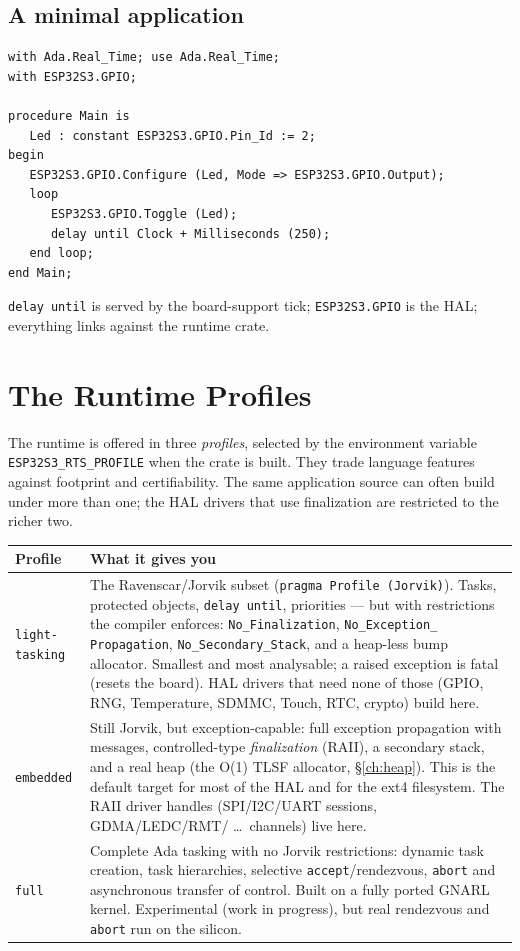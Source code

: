 \section{A minimal application}

\begin{lstlisting}
with Ada.Real_Time; use Ada.Real_Time;
with ESP32S3.GPIO;

procedure Main is
   Led : constant ESP32S3.GPIO.Pin_Id := 2;
begin
   ESP32S3.GPIO.Configure (Led, Mode => ESP32S3.GPIO.Output);
   loop
      ESP32S3.GPIO.Toggle (Led);
      delay until Clock + Milliseconds (250);
   end loop;
end Main;
\end{lstlisting}

\texttt{delay until} is served by the board-support tick; \texttt{ESP32S3.GPIO} is
the HAL; everything links against the runtime crate.

\chapter{The Runtime Profiles}
\label{ch:profiles}

The runtime is offered in three \emph{profiles}, selected by the environment
variable \texttt{ESP32S3\_RTS\_PROFILE} when the crate is built. They trade
language features against footprint and certifiability. The same application
source can often build under more than one; the HAL drivers that use finalization
are restricted to the richer two.

\begin{longtable}{p{2.6cm} p{11.3cm}}
\toprule
\textbf{Profile} & \textbf{What it gives you} \\ \midrule
\endhead
\texttt{light-tasking} &
  The Ravenscar/Jorvik subset (\texttt{pragma Profile (Jorvik)}). Tasks,
  protected objects, \texttt{delay until}, priorities --- but with restrictions
  the compiler enforces: \texttt{No\_Finalization}, \texttt{No\_Exception\_%
  Propagation}, \texttt{No\_Secondary\_Stack}, and a heap-less bump allocator.
  Smallest and most analysable; a raised exception is fatal (resets the board).
  HAL drivers that need none of those (GPIO, RNG, Temperature, SDMMC, Touch,
  RTC, crypto) build here. \\
\texttt{embedded} &
  Still Jorvik, but exception-capable: full exception propagation with messages,
  controlled-type \emph{finalization} (RAII), a secondary stack, and a real
  heap (the O(1) TLSF allocator, \S\ref{ch:heap}). This is the default target for most of the HAL and for the
  ext4 filesystem. The RAII driver handles (SPI/I2C/UART sessions, GDMA/LEDC/RMT/
  \dots\ channels) live here. \\
\texttt{full} &
  Complete Ada tasking with no Jorvik restrictions: dynamic task creation, task
  hierarchies, selective \texttt{accept}/rendezvous, \texttt{abort} and
  asynchronous transfer of control. Built on a fully ported GNARL kernel.
  Experimental (work in progress), but real rendezvous and \texttt{abort} run on
  the silicon. \\
\bottomrule
\end{longtable}

